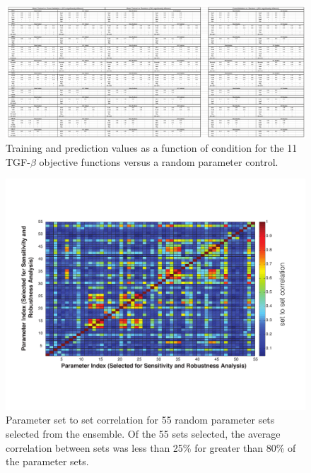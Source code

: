 \begin{figure}
\includegraphics [width=1.0\linewidth] {./figs/Fig-6-Supplemental-CompeteErrorTable.pdf}
\caption{Training and prediction values as a function of condition for the 11 TGF-$\beta$ objective functions versus a random parameter control.}\label{fig:S6}
\end{figure}

\begin{figure}
\includegraphics [width=1.0\linewidth] {./figs/Fig-7-Supplemental-Correlation.pdf}
\caption{Parameter set to set correlation for 55 random parameter sets selected from the ensemble.
Of the 55 sets selected, the average correlation between sets was less than 25\% for greater than 80\% of the parameter sets.}\label{fig:S7}
\end{figure}

